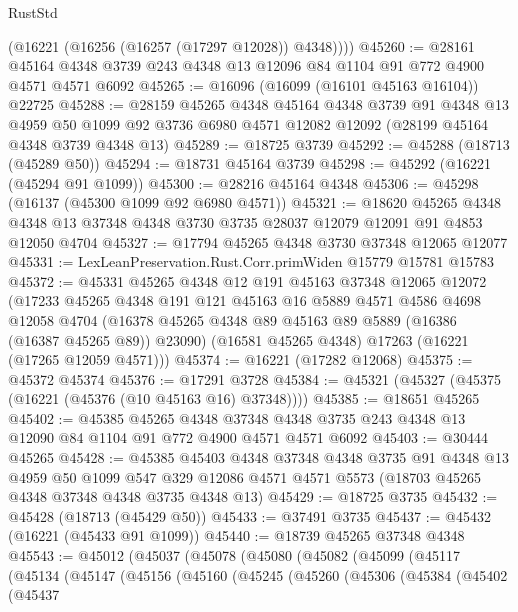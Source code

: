 \begin{lexlean}{RustStd}
\begin{coremodule}
        (@16221 (@16256 (@16257 (@17297 @12028)) @4348))))
@45260 := @28161 @45164 @4348 @3739 @243 @4348 @13 @12096 @84 @1104 @91 @772 @4900 @4571 @4571 @6092
@45265 := @16096 (@16099 (@16101 @45163 @16104)) @22725
@45288 := @28159
    @45265
    @4348
    @45164
    @4348
    @3739
    @91
    @4348
    @13
    @4959
    @50
    @1099
    @92
    @3736
    @6980
    @4571
    @12082
    @12092
    (@28199 @45164 @4348 @3739 @4348 @13)
@45289 := @18725 @3739
@45292 := @45288 (@18713 (@45289 @50))
@45294 := @18731 @45164 @3739
@45298 := @45292 (@16221 (@45294 @91 @1099))
@45300 := @28216 @45164 @4348
@45306 := @45298 (@16137 (@45300 @1099 @92 @6980 @4571))
@45321 := @18620
    @45265
    @4348
    @4348
    @13
    @37348
    @4348
    @3730
    @3735
    @28037
    @12079
    @12091
    @91
    @4853
    @12050
    @4704
@45327 := @17794 @45265 @4348 @3730 @37348 @12065 @12077
@45331 := LexLeanPreservation.Rust.Corr.primWiden @15779 @15781 @15783
@45372 := @45331
    @45265
    @4348
    @12
    @191
    @45163
    @37348
    @12065
    @12072
    (@17233
      @45265
      @4348
      @191
      @121
      @45163
      @16
      @5889
      @4571
      @4586
      @4698
      @12058
      @4704
      (@16378 @45265 @4348 @89 @45163 @89 @5889 (@16386 (@16387 @45265 @89)) @23090)
      (@16581 @45265 @4348)
      @17263
      (@16221 (@17265 @12059 @4571)))
@45374 := @16221 (@17282 @12068)
@45375 := @45372 @45374
@45376 := @17291 @3728
@45384 := @45321 (@45327 (@45375 (@16221 (@45376 (@10 @45163 @16) @37348))))
@45385 := @18651 @45265
@45402 := @45385
    @45265
    @4348
    @37348
    @4348
    @3735
    @243
    @4348
    @13
    @12090
    @84
    @1104
    @91
    @772
    @4900
    @4571
    @4571
    @6092
@45403 := @30444 @45265
@45428 := @45385
    @45403
    @4348
    @37348
    @4348
    @3735
    @91
    @4348
    @13
    @4959
    @50
    @1099
    @547
    @329
    @12086
    @4571
    @4571
    @5573
    (@18703 @45265 @4348 @37348 @4348 @3735 @4348 @13)
@45429 := @18725 @3735
@45432 := @45428 (@18713 (@45429 @50))
@45433 := @37491 @3735
@45437 := @45432 (@16221 (@45433 @91 @1099))
@45440 := @18739 @45265 @37348 @4348
@45543 := @45012
    (@45037
      (@45078
        (@45080
          (@45082
            (@45099
              (@45117
                (@45134
                  (@45147
                    (@45156
                      (@45160
                        (@45245
                          (@45260
                            (@45306
                              (@45384
                                (@45402
                                  (@45437

\end{coremodule}
\end{lexlean}

